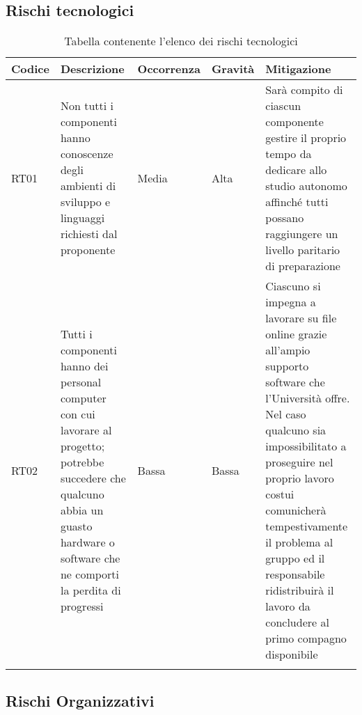 \documentclass[../piano_di_progetto.tex]{subfiles}
\begin{document}
\newpage

\subsection{Rischi tecnologici}%
\label{sub:rischi_tec}

\begin{center}
	\begin{longtable}{|p{1.6cm}| p{3.5cm} | p{2cm}|p{2cm}|p{3.5cm}|}
		\hline
		\rowcolor{lightgray}
		{\textbf{Codice}} & {\textbf{Descrizione}} & {\textbf{Occorrenza}} & {\textbf{Gravità}} & {\textbf{Mitigazione}} \\

		\hline
			RT01&
			Non tutti i componenti hanno conoscenze degli ambienti di sviluppo e linguaggi richiesti dal proponente
			&
			Media
			& 
			Alta
			&
			Sarà compito di ciascun componente gestire il proprio tempo da dedicare allo studio autonomo affinché tutti possano raggiungere un livello paritario di preparazione 
\\			
			\hline
			RT02 &
			Tutti i componenti hanno dei personal computer con cui lavorare al progetto; potrebbe succedere che qualcuno abbia un guasto hardware o software che ne comporti la perdita di progressi
			&
			Bassa
			& 
			Bassa
			& 
			Ciascuno si impegna a lavorare su file online grazie all’ampio supporto software che l’Università offre. Nel caso qualcuno sia impossibilitato a proseguire nel proprio lavoro costui comunicherà tempestivamente il problema al gruppo ed il responsabile ridistribuirà il lavoro da concludere al primo compagno disponibile\\
			\hline
			\rowcolor{white}
		\caption{Tabella contenente l'elenco dei rischi tecnologici}
	\end{longtable}

\end{center}

\subsection{Rischi Organizzativi}%
\label{sub:rischi_org}
\end{document}
